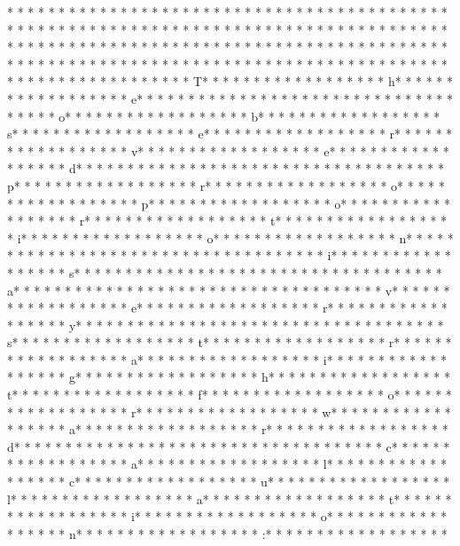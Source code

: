 * * *  * * *  * * *  *  * * *  *  * * *  * 
* * *  * * *  * * *  *  * * *  *  * * *  * * *  * * *  *  * * *  *  * * *  * * *  * * *  *  * * *  *  * * *  *  * * *  * * *  * * *  *  * * *  *  * * *  *  * * *  * * *  * * *  *  * * *  *  * * *  *  * * *  * * *  * * *  *  * * *  *  * * *  *  * * *  * * *  * * *  *  * * *  *  * * *  *  * * *  * * *  * * *  *  * * *  *  * * *  *  * * *  * * *  * * *  *  * * *  *  * * *  *  * * *  * * *  * * *  *  * * *  *  * * *  * T* * *  * * *  * * *  *  * * *  *  * * *  * h* * *  * * *  * * *  *  * * *  *  * * *  * e* * *  * * *  * * *  *  * * *  *  * * *  *  * * *  * * *  * * *  *  * * *  *  * * *  * o* * *  * * *  * * *  *  * * *  *  * * *  * b* * *  * * *  * * *  *  * * *  *  * * *  * s* * *  * * *  * * *  *  * * *  *  * * *  * e* * *  * * *  * * *  *  * * *  *  * * *  * r* * *  * * *  * * *  *  * * *  *  * * *  * v* * *  * * *  * * *  *  * * *  *  * * *  * e* * *  * * *  * * *  *  * * *  *  * * *  * d* * *  * * *  * * *  *  * * *  *  * * *  *  * * *  * * *  * * *  *  * * *  *  * * *  * p* * *  * * *  * * *  *  * * *  *  * * *  * r* * *  * * *  * * *  *  * * *  *  * * *  * o* * *  * * *  * * *  *  * * *  *  * * *  * p* * *  * * *  * * *  *  * * *  *  * * *  * o* * *  * * *  * * *  *  * * *  *  * * *  * r* * *  * * *  * * *  *  * * *  *  * * *  * t* * *  * * *  * * *  *  * * *  *  * * *  * i* * *  * * *  * * *  *  * * *  *  * * *  * o* * *  * * *  * * *  *  * * *  *  * * *  * n* * *  * * *  * * *  *  * * *  *  * * *  *  * * *  * * *  * * *  *  * * *  *  * * *  * i* * *  * * *  * * *  *  * * *  *  * * *  * s* * *  * * *  * * *  *  * * *  *  * * *  *  * * *  * * *  * * *  *  * * *  *  * * *  * a* * *  * * *  * * *  *  * * *  *  * * *  *  * * *  * * *  * * *  *  * * *  *  * * *  * v* * *  * * *  * * *  *  * * *  *  * * *  * e* * *  * * *  * * *  *  * * *  *  * * *  * r* * *  * * *  * * *  *  * * *  *  * * *  * y* * *  * * *  * * *  *  * * *  *  * * *  *  * * *  * * *  * * *  *  * * *  *  * * *  * s* * *  * * *  * * *  *  * * *  *  * * *  * t* * *  * * *  * * *  *  * * *  *  * * *  * r* * *  * * *  * * *  *  * * *  *  * * *  * a* * *  * * *  * * *  *  * * *  *  * * *  * i* * *  * * *  * * *  *  * * *  *  * * *  * g* * *  * * *  * * *  *  * * *  *  * * *  * h* * *  * * *  * * *  *  * * *  *  * * *  * t* * *  * * *  * * *  *  * * *  *  * * *  * f* * *  * * *  * * *  *  * * *  *  * * *  * o* * *  * * *  * * *  *  * * *  *  * * *  * r* * *  * * *  * * *  *  * * *  *  * * *  * w* * *  * * *  * * *  *  * * *  *  * * *  * a* * *  * * *  * * *  *  * * *  *  * * *  * r* * *  * * *  * * *  *  * * *  *  * * *  * d* * *  * * *  * * *  *  * * *  *  * * *  *  * * *  * * *  * * *  *  * * *  *  * * *  * c* * *  * * *  * * *  *  * * *  *  * * *  * a* * *  * * *  * * *  *  * * *  *  * * *  * l* * *  * * *  * * *  *  * * *  *  * * *  * c* * *  * * *  * * *  *  * * *  *  * * *  * u* * *  * * *  * * *  *  * * *  *  * * *  * l* * *  * * *  * * *  *  * * *  *  * * *  * a* * *  * * *  * * *  *  * * *  *  * * *  * t* * *  * * *  * * *  *  * * *  *  * * *  * i* * *  * * *  * * *  *  * * *  *  * * *  * o* * *  * * *  * * *  *  * * *  *  * * *  * n* * *  * * *  * * *  *  * * *  *  * * *  * :* * *  * * *  * * *  *  * * *  *  * * *  * 
